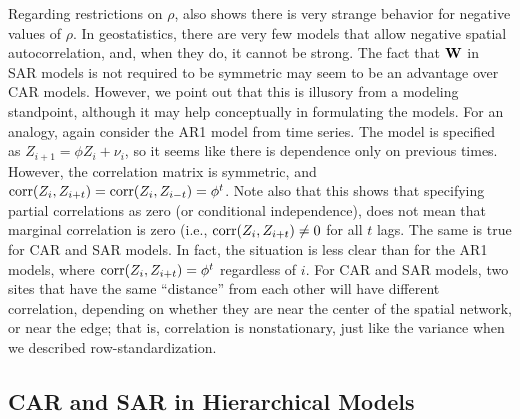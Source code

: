 \documentclass[11pt, titlepage]{article}\usepackage[]{graphicx}\usepackage[]{color}
\begin{document}
Regarding restrictions on $\rho$, \citet{Wall:clos:2004} also shows there is very strange behavior for negative values of $\rho$. In geostatistics, there are very few models that allow negative spatial autocorrelation, and, when they do, it cannot be strong. The fact that $\mathbf{W}$ in SAR models is not required to be symmetric may seem to be an advantage over CAR models.  However, we point out that this is illusory from a modeling standpoint, although it may help conceptually in formulating the models.  For an analogy, again consider the AR1 model from time series.  The model is specified as $Z_{i+1} = \phi Z_i + \nu_i$, so it seems like there is dependence only on previous times.  However, the correlation matrix is symmetric, and $\textrm{corr}(Z_i, Z_{i + t}) = \textrm{corr}(Z_i,Z_{i - t}) = \phi^t$.  Note also that this shows that specifying partial correlations as zero (or conditional independence), does not mean that marginal correlation is zero (i.e., $\textrm{corr}(Z_i, Z_{i + t}) \neq 0$ for all $t$ lags.  The same is true for CAR and SAR models.  In fact, the situation is less clear than for the AR1 models, where $\textrm{corr}(Z_i, Z_{i + t}) = \phi^t$ regardless of $i$.  For CAR and SAR models, two sites that have the same ``distance'' from each other will have different correlation, depending on whether they are near the center of the spatial network, or near the edge; that is, correlation is nonstationary, just like the variance when we described row-standardization.

\subsection*{CAR and SAR in Hierarchical Models}
\end{document}
